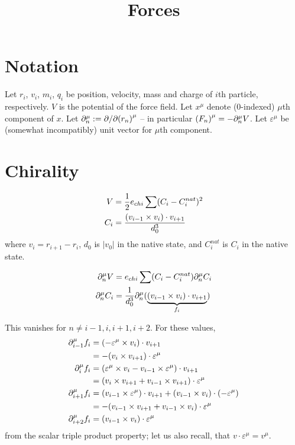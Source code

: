 \documentclass{article}
\title{Forces}
\author{}
\date{}
\DeclarePairedDelimiter{\brk}{(}{)}
\newcommand{\cross}{\times}
\begin{document}
  \maketitle

  \section*{Notation}
  Let $r_i$, $v_i$, $m_i$, $q_i$ be position, velocity, mass and charge of $i$th particle, respectively. $V$ is the potential of the force field. Let $x^\mu$ denote (0-indexed) $\mu$th component of $x$. Let $\partial_n^\mu := \partial/\partial \brk*{r_n}^\mu$ -- in particular $\brk*{F_n}^\mu = -\partial_n^\mu V$. Let $\varepsilon^\mu$ be (somewhat incompatibly) unit vector for $\mu$th component.

  \section*{Chirality}
  \begin{align*}
    V &= \frac{1}{2} e_{chi} \sum (C_i - C_i^{nat})^2\\
    C_i &= \frac{\brk*{v_{i-1} \cross v_i} \cdot v_{i+1}}{d_0^3}
  \end{align*}
  where $v_i = r_{i+1} - r_i$, $d_0$ is $|v_0|$ in the native state, and $C_i^{nat}$ is $C_i$ in the native state.

  \begin{align*}
    \partial_n^\mu V &= e_{chi} \sum (C_i - C_i^{nat}) \partial_n^\mu C_i\\
    \partial_n^\mu C_i &= \frac{1}{d_0^3} \partial_n^\mu \brk{\underbrace{\brk*{v_{i-1} \cross v_i} \cdot v_{i+1}}_{f_i}}
  \end{align*}

  This vanishes for $n \not= i-1, i, i+1, i+2$. For these values,
  \begin{align*}
    \partial_{i-1}^\mu f_i &= \brk*{-\varepsilon^\mu \cross v_i} \cdot v_{i+1}\\
    &= -\brk*{v_i \cross v_{i+1}} \cdot \varepsilon^\mu\\
    \partial_i^\mu f_i &= \brk*{\varepsilon^\mu \cross v_i - v_{i-1} \cross \varepsilon^\mu} \cdot v_{i+1}\\
    &= \brk*{v_i \cross v_{i+1} + v_{i-1} \cross v_{i+1}} \cdot \varepsilon^\mu\\
    \partial_{i+1}^\mu f_i &= \brk*{v_{i-1} \cross \varepsilon^\mu} \cdot v_{i+1} + \brk*{v_{i-1} \cross v_i} \cdot \brk*{-\varepsilon^\mu}\\
    &= -\brk*{v_{i-1} \cross v_{i+1} + v_{i-1} \cross v_i} \cdot \varepsilon^\mu\\
    \partial_{i+2}^\mu f_i &= \brk*{v_{i-1} \cross v_i} \cdot \varepsilon^\mu
  \end{align*}
  from the scalar triple product property; let us also recall, that $v \cdot \varepsilon^\mu = v^\mu$.
\end{document}
